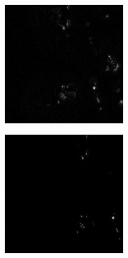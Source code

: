 \begin{figure}
	\centering
	\begin{subfigure}[b]{0.22\textwidth}
		\centering
		\includegraphics[width=\textwidth]{bilder/preprocessing/crop_golgi_not_full_processed.png}
		\caption{}
		\label{subfig:vanilla}
	\end{subfigure}
	\hfill
	\begin{subfigure}[b]{0.22\textwidth}
		\centering
		\includegraphics[width=\textwidth]{bilder/preprocessing/crop_golgi_full_processed.png}

\end{subfigure}
\end{figure}
